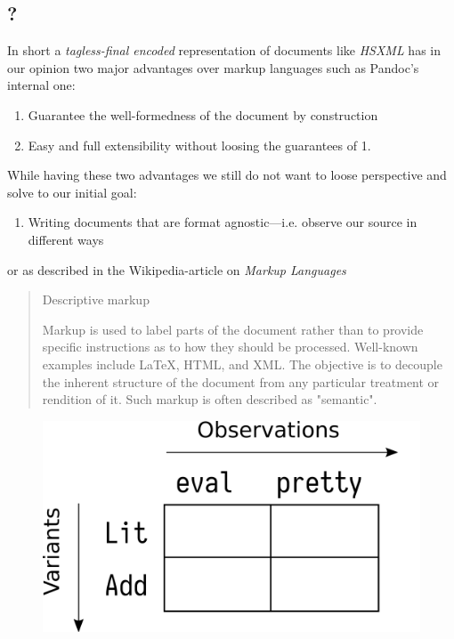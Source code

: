 \subsection{?}

In short a \emph{tagless-final encoded} representation of documents like
\emph{HSXML} has in our opinion two major advantages over markup languages such
as Pandoc’s internal one:

\begin{enumerate}
\item Guarantee the well-formedness of the document by construction
\item Easy and full extensibility without loosing the guarantees of 1.
\end{enumerate}

While having these two advantages we still do not want to loose perspective and
solve to our initial goal:

\begin{enumerate}
\item Writing documents that are format agnostic—i.e. observe our source in
different ways
\end{enumerate}

or as described in the Wikipedia-article on \emph{Markup Languages}

\begin{quote}
Descriptive markup

Markup is used to label parts of the document rather than to provide specific
instructions as to how they should be processed. Well-known examples include
\LaTeX{}, HTML, and XML. The objective is to decouple the inherent structure of
the document from any particular treatment or rendition of it. Such markup is
often described as "semantic".
\end{quote}

\vspace*{\fill}
\begin{figure}
    \centering
    \includegraphics{resources/expression_problem_dimensions.png}
\end{figure}
\vspace*{\fill}
\clearpage

